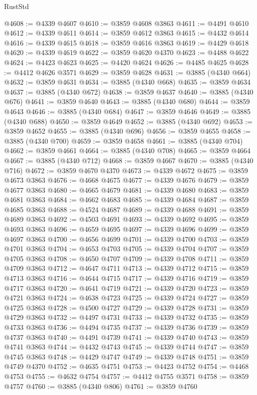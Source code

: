 \begin{lexlean}{RustStd}
\begin{coremodule}
@4608 := @4339 @4607
@4610 := @3859 @4608 @3863
@4611 := @4491 @4610
@4612 := @4339 @4611
@4614 := @3859 @4612 @3863
@4615 := @4432 @4614
@4616 := @4339 @4615
@4618 := @3859 @4616 @3863
@4619 := @4429 @4618
@4620 := @4339 @4619
@4622 := @3859 @4620 @4370
@4623 := @4488 @4622
@4624 := @4423 @4623
@4625 := @4420 @4624
@4626 := @4485 @4625
@4628 := @4412 @4626 @3571
@4629 := @3859 @4628
@4631 := @3885 (@4340 @664)
@4632 := @3859 @4631
@4634 := @3885 (@4340 @668)
@4635 := @3859 @4634
@4637 := @3885 (@4340 @672)
@4638 := @3859 @4637
@4640 := @3885 (@4340 @676)
@4641 := @3859 @4640
@4643 := @3885 (@4340 @680)
@4644 := @3859 @4643
@4646 := @3885 (@4340 @684)
@4647 := @3859 @4646
@4649 := @3885 (@4340 @688)
@4650 := @3859 @4649
@4652 := @3885 (@4340 @692)
@4653 := @3859 @4652
@4655 := @3885 (@4340 @696)
@4656 := @3859 @4655
@4658 := @3885 (@4340 @700)
@4659 := @3859 @4658
@4661 := @3885 (@4340 @704)
@4662 := @3859 @4661
@4664 := @3885 (@4340 @708)
@4665 := @3859 @4664
@4667 := @3885 (@4340 @712)
@4668 := @3859 @4667
@4670 := @3885 (@4340 @716)
@4672 := @3859 @4670 @4370
@4673 := @4339 @4672
@4675 := @3859 @4673 @3863
@4676 := @4668 @4675
@4677 := @4339 @4676
@4679 := @3859 @4677 @3863
@4680 := @4665 @4679
@4681 := @4339 @4680
@4683 := @3859 @4681 @3863
@4684 := @4662 @4683
@4685 := @4339 @4684
@4687 := @3859 @4685 @3863
@4688 := @4524 @4687
@4689 := @4339 @4688
@4691 := @3859 @4689 @3863
@4692 := @4503 @4691
@4693 := @4339 @4692
@4695 := @3859 @4693 @3863
@4696 := @4659 @4695
@4697 := @4339 @4696
@4699 := @3859 @4697 @3863
@4700 := @4656 @4699
@4701 := @4339 @4700
@4703 := @3859 @4701 @3863
@4704 := @4653 @4703
@4705 := @4339 @4704
@4707 := @3859 @4705 @3863
@4708 := @4650 @4707
@4709 := @4339 @4708
@4711 := @3859 @4709 @3863
@4712 := @4647 @4711
@4713 := @4339 @4712
@4715 := @3859 @4713 @3863
@4716 := @4644 @4715
@4717 := @4339 @4716
@4719 := @3859 @4717 @3863
@4720 := @4641 @4719
@4721 := @4339 @4720
@4723 := @3859 @4721 @3863
@4724 := @4638 @4723
@4725 := @4339 @4724
@4727 := @3859 @4725 @3863
@4728 := @4500 @4727
@4729 := @4339 @4728
@4731 := @3859 @4729 @3863
@4732 := @4497 @4731
@4733 := @4339 @4732
@4735 := @3859 @4733 @3863
@4736 := @4494 @4735
@4737 := @4339 @4736
@4739 := @3859 @4737 @3863
@4740 := @4491 @4739
@4741 := @4339 @4740
@4743 := @3859 @4741 @3863
@4744 := @4432 @4743
@4745 := @4339 @4744
@4747 := @3859 @4745 @3863
@4748 := @4429 @4747
@4749 := @4339 @4748
@4751 := @3859 @4749 @4370
@4752 := @4635 @4751
@4753 := @4423 @4752
@4754 := @4468 @4753
@4755 := @4632 @4754
@4757 := @4412 @4755 @3571
@4758 := @3859 @4757
@4760 := @3885 (@4340 @806)
@4761 := @3859 @4760

\end{coremodule}
\end{lexlean}
